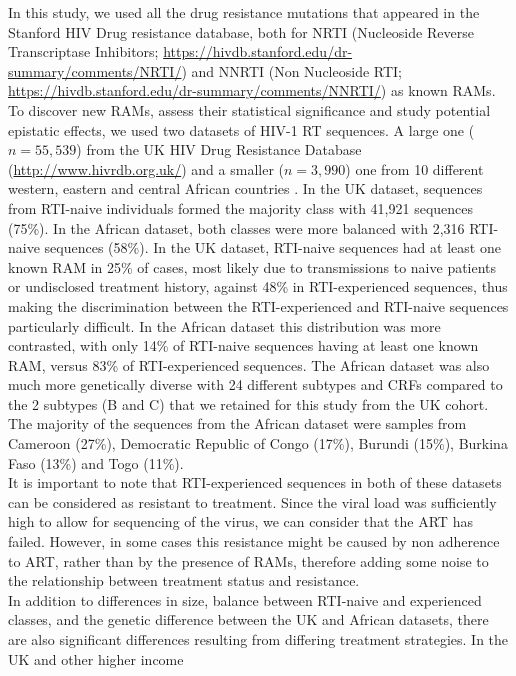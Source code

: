 \documentclass[
  11pt,
  twoside]{scrbook}
\begin{document}
In this study, we used all the drug resistance mutations that appeared
in the Stanford HIV Drug resistance database, both for NRTI (Nucleoside
Reverse Transcriptase Inhibitors;
\url{https://hivdb.stanford.edu/dr-summary/comments/NRTI/}) and NNRTI (Non
Nucleoside RTI; \url{https://hivdb.stanford.edu/dr-summary/comments/NNRTI/})
as known RAMs. To discover new RAMs, assess their statistical
significance and study potential epistatic effects, we used two datasets
of HIV-1 RT sequences. A large one (\(n=55,539\)) from the UK HIV Drug
Resistance Database (\url{http://www.hivrdb.org.uk/}) and a smaller
(\(n=3,990\)) one from 10 different western, eastern and central African
countries \autocite{villabona-arenasIndepthAnalysisHIV12016}. In the UK dataset,
sequences from RTI-naive individuals formed the majority class with
41,921 sequences (75\%). In the African dataset, both classes were more
balanced with 2,316 RTI-naive sequences (58\%). In the UK dataset,
RTI-naive sequences had at least one known RAM in 25\% of cases, most
likely due to transmissions to naive patients or undisclosed treatment
history, against 48\% in RTI-experienced sequences, thus making the
discrimination between the RTI-experienced and RTI-naive sequences
particularly difficult. In the African dataset this distribution was
more contrasted, with only 14\% of RTI-naive sequences having at least
one known RAM, versus 83\% of RTI-experienced sequences. The African
dataset was also much more genetically diverse with 24 different
subtypes and CRFs compared to the 2 subtypes (B and C) that we retained
for this study from the UK cohort. The majority of the sequences from
the African dataset were samples from Cameroon (27\%), Democratic
Republic of Congo (17\%), Burundi (15\%), Burkina Faso (13\%) and Togo
(11\%).\\
It is important to note that RTI-experienced sequences in both of these
datasets can be considered as resistant to treatment. Since the viral
load was sufficiently high to allow for sequencing of the virus, we can
consider that the ART has failed. However, in some cases this resistance
might be caused by non adherence to ART, rather than by the presence of
RAMs, therefore adding some noise to the relationship between treatment
status and resistance.\\
In addition to differences in size, balance between RTI-naive and
experienced classes, and the genetic difference between the UK and
African datasets, there are also significant differences resulting from
differing treatment strategies. In the UK and other higher income
\end{document}
